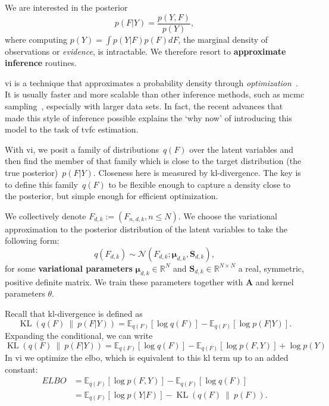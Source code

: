 We are interested in the posterior
\begin{equation}
  p(F|Y) = \frac{p(Y,F)}{p(Y)},
\end{equation}
where computing $p(Y) = \int p(Y|F)p(F)dF$, the marginal density of observations or \emph{evidence}, is intractable.
We therefore resort to \textbf{approximate inference} routines.

\Gls{vi} is a technique that approximates a probability density through \emph{optimization}~\parencite{Jordan1999, Hoffman2015, Blei2017}.
It is usually faster and more scalable than other inference methods, such as \gls{mcmc} sampling~\parencite[as used in e.g.][]{Fox2011}, especially with larger data sets.
In fact, the recent advances that made this style of inference possible explains the `why now' of introducing this model to the task of \gls{tvfc} estimation.

With \gls{vi}, we posit a family of distributions~$q(F)$ over the latent variables and then find the member of that family which is close to the target distribution (the true posterior)~$p(F|Y)$.
Closeness here is measured by \gls{kl-divergence}.
The key is to define this family~$q(F)$ to be flexible enough to capture a density close to the posterior, but simple enough for efficient optimization.

We collectively denote $F_{d,k} := (F_{n,d,k}, n \leq N)$.
We choose the variational approximation to the posterior distribution of the latent variables to take the following form:
\begin{equation}
  q(F_{d,k}) \sim \mathcal{N}(F_{d,k};\boldsymbol{\mu}_{d,k}, \mathbf{S}_{d,k}),
\end{equation}
for some \textbf{variational parameters} $\boldsymbol{\mu}_{d,k} \in \mathbb{R}^N$ and $\mathbf{S}_{d,k} \in \mathbb{R}^{N \times N}$ a real, symmetric, positive definite matrix.
We train these parameters together with $\mathbf{A}$ and kernel parameters $\theta$.

Recall that \gls{kl-divergence} is defined as
\begin{equation}
  \operatorname{KL}(q(F)~\|~p(F | Y)) = \mathbb{E}_{q(F)}[\log q(F)] - \mathbb{E}_{q(F)}[\log p(F | Y)].
\end{equation}
Expanding the conditional, we can write
\begin{equation}
  \operatorname{KL}(q(F)~\|~p(F | Y)) = \mathbb{E}_{q(F)}[\log q(F)] - \mathbb{E}_{q(F)}[\log p(F, Y)] + \log p(Y)
\end{equation}
In \gls{vi} we optimize the \gls{elbo}, which is equivalent to this \gls{kl} term up to an added constant:
\begin{equation} \label{eq1}
  \begin{split}
    ELBO & = \mathbb{E}_{q(F)}[\log p(F, Y)] - \mathbb{E}_{q(F)}[\log q(F)] \\
    & = \mathbb{E}_{q(F)}[\log p(Y|F)] - \operatorname{KL}(q(F)~\|~p(F)).
  \end{split}
\end{equation}

